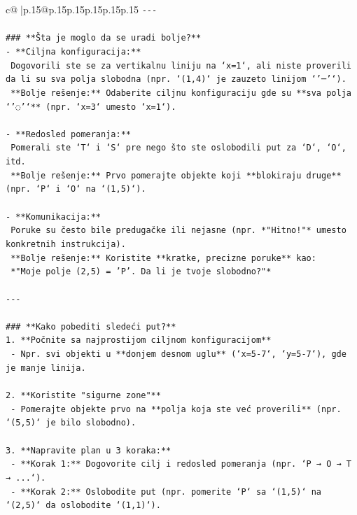 \documentclass{article}
\begin{document}
{\begin{supertabular}{c@{$\;$}|p{.15\linewidth}@{}p{.15\linewidth}p{.15\linewidth}p{.15\linewidth}p{.15\linewidth}p{.15\linewidth}}
{{{\texttt{{-}{-}{-}} \\
\\ 
\texttt{\#\#\# **Šta je moglo da se uradi bolje?**} \\
\texttt{{-} **Ciljna konfiguracija:**} \\
\texttt{  Dogovorili ste se za vertikalnu liniju na `x=1`, ali niste proverili da li su sva polja slobodna (npr. `(1,4)` je zauzeto linijom `'─'`).} \\
\texttt{  **Bolje rešenje:** Odaberite ciljnu konfiguraciju gde su **sva polja `'◌'`** (npr. `x=3` umesto `x=1`).} \\
\\ 
\texttt{{-} **Redosled pomeranja:**} \\
\texttt{  Pomerali ste `T` i `S` pre nego što ste oslobodili put za `D`, `O`, itd.} \\
\texttt{  **Bolje rešenje:** Prvo pomerajte objekte koji **blokiraju druge** (npr. `P` i `O` na `(1,5)`).} \\
\\ 
\texttt{{-} **Komunikacija:**} \\
\texttt{  Poruke su često bile predugačke ili nejasne (npr. *"Hitno!"* umesto konkretnih instrukcija).} \\
\texttt{  **Bolje rešenje:** Koristite **kratke, precizne poruke** kao:} \\
\texttt{  *"Moje polje (2,5) = 'P'. Da li je tvoje slobodno?"*} \\
\\ 
\texttt{{-}{-}{-}} \\
\\ 
\texttt{\#\#\# **Kako pobediti sledeći put?**} \\
\texttt{1. **Počnite sa najprostijom ciljnom konfiguracijom**} \\
\texttt{   {-} Npr. svi objekti u **donjem desnom uglu** (`x=5{-}7`, `y=5{-}7`), gde je manje linija.} \\
\\ 
\texttt{2. **Koristite "sigurne zone"**} \\
\texttt{   {-} Pomerajte objekte prvo na **polja koja ste već proverili** (npr. `(5,5)` je bilo slobodno).} \\
\\ 
\texttt{3. **Napravite plan u 3 koraka:**} \\
\texttt{   {-} **Korak 1:** Dogovorite cilj i redosled pomeranja (npr. `P → O → T → ...`).} \\
\texttt{   {-} **Korak 2:** Oslobodite put (npr. pomerite `P` sa `(1,5)` na `(2,5)` da oslobodite `(1,1)`).} \\
}}}
\end{supertabular}}
\end{document}
